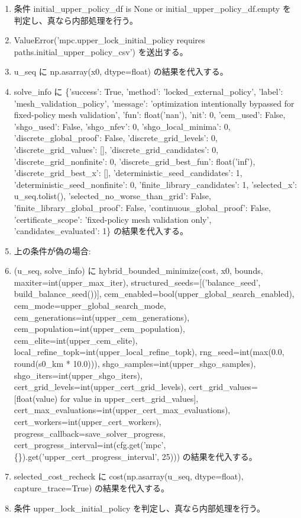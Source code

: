 \documentclass[a4paper,11pt]{article}
\begin{document}
\begin{enumerate}[leftmargin=1.8em]
\item   条件 initial\_upper\_policy\_df is None or initial\_upper\_policy\_df.empty を判定し、真なら内部処理を行う。
\item     ValueError('mpc.upper\_lock\_initial\_policy requires paths.initial\_upper\_policy\_csv') を送出する。
\item   u\_seq に np.asarray(x0, dtype=float) の結果を代入する。
\item   solve\_info に \{'success': True, 'method': 'locked\_external\_policy', 'label': 'mesh\_validation\_policy', 'message': 'optimization intentionally bypassed for fixed-policy mesh validation', 'fun': float('nan'), 'nit': 0, 'cem\_used': False, 'shgo\_used': False, 'shgo\_nfev': 0, 'shgo\_local\_minima': 0, 'discrete\_global\_proof': False, 'discrete\_grid\_levels': 0, 'discrete\_grid\_values': [], 'discrete\_grid\_candidates': 0, 'discrete\_grid\_nonfinite': 0, 'discrete\_grid\_best\_fun': float('inf'), 'discrete\_grid\_best\_x': [], 'deterministic\_seed\_candidates': 1, 'deterministic\_seed\_nonfinite': 0, 'finite\_library\_candidates': 1, 'selected\_x': u\_seq.tolist(), 'selected\_no\_worse\_than\_grid': False, 'finite\_library\_global\_proof': False, 'continuous\_global\_proof': False, 'certificate\_scope': 'fixed-policy mesh validation only', 'candidates\_evaluated': 1\} の結果を代入する。
\item   上の条件が偽の場合:
\item   (u\_seq, solve\_info) に hybrid\_bounded\_minimize(cost, x0, bounds, maxiter=int(upper\_max\_iter), structured\_seeds=[('balance\_seed', build\_balance\_seed())], cem\_enabled=bool(upper\_global\_search\_enabled), cem\_mode=upper\_global\_search\_mode, cem\_generations=int(upper\_cem\_generations), cem\_population=int(upper\_cem\_population), cem\_elite=int(upper\_cem\_elite), local\_refine\_topk=int(upper\_local\_refine\_topk), rng\_seed=int(max(0.0, round(s0\_km * 10.0))), shgo\_samples=int(upper\_shgo\_samples), shgo\_iters=int(upper\_shgo\_iters), cert\_grid\_levels=int(upper\_cert\_grid\_levels), cert\_grid\_values=[float(value) for value in upper\_cert\_grid\_values], cert\_max\_evaluations=int(upper\_cert\_max\_evaluations), cert\_workers=int(upper\_cert\_workers), progress\_callback=save\_solver\_progress, cert\_progress\_interval=int(cfg.get('mpc', \{\}).get('upper\_cert\_progress\_interval', 25))) の結果を代入する。
\item selected\_cost\_recheck に cost(np.asarray(u\_seq, dtype=float), capture\_trace=True) の結果を代入する。
\item 条件 upper\_lock\_initial\_policy を判定し、真なら内部処理を行う。

\end{enumerate}
\end{document}
